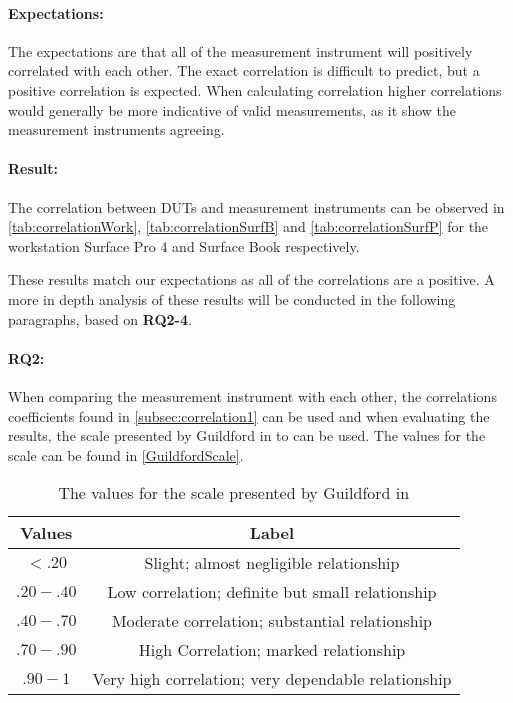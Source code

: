 

\paragraph{Expectations:} The expectations are that all of the measurement instrument will positively correlated with each other. The exact correlation is difficult to predict, but a positive correlation is expected. When calculating correlation higher correlations would generally be more indicative of valid measurements, as it show the measurement instruments agreeing.

\paragraph{Result:} The correlation between DUTs and measurement instruments can be observed in \cref{tab:correlationWork},  \cref{tab:correlationSurfB} and \cref{tab:correlationSurfP} for the workstation Surface Pro 4 and Surface Book respectively.




These results match our expectations as all of the correlations are a positive. A more in depth analysis of these results will be conducted in the following paragraphs, based on \textbf{RQ2-4}.

\paragraph{RQ2:} When comparing the measurement instrument with each other, the correlations coefficients found in \cref{subsec:correlation1} can be used and when evaluating the results, the scale presented by Guildford in \cite[219]{guilford1950fundamental} to can be used. The values for the scale can be found in \cref{GuildfordScale}.


\begin{table}[ht]
    \centering
    \begin{tabular}{|| c | c ||}
        \hline
        \textbf{Values} & \textbf{Label} \\ [0.5ex] \hline\hline
        $<.20$ & Slight; almost negligible relationship \\
        $.20-.40$ & Low correlation; definite but small relationship \\
        $.40-.70$ & Moderate correlation; substantial relationship \\
        $.70-.90$ & High Correlation; marked relationship \\
        $.90-1$ & Very high correlation; very dependable relationship \\ \hline
    \end{tabular}
    \caption{The values for the scale presented by Guildford in \cite[219]{guilford1950fundamental} }
    \label{tab:GuildfordScale}
\end{table}

